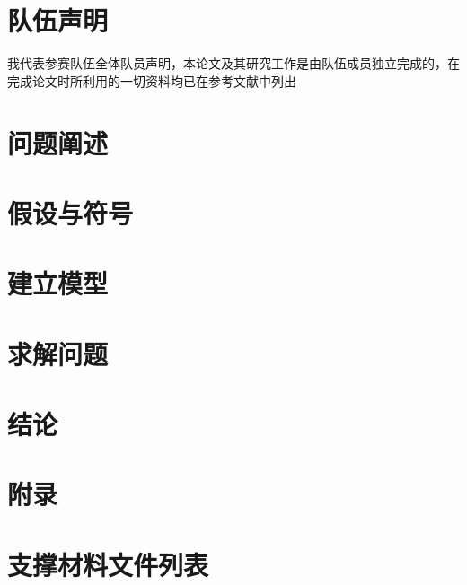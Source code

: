 \documentclass[zihao=-4,UTF8]{ctexart}
\begin{document}
\section*{队伍声明}

我代表参赛队伍全体队员声明，本论文及其研究工作是由队伍成员独立完成的，在完成论文时所利用的一切资料均已在参考文献中列出 
\newpage
\tableofcontents

\section{问题阐述}

\section{假设与符号}

\section{建立模型}

\section{求解问题}

\newpage
\section*{结论}


\newpage
\section*{附录}


\section*{支撑材料文件列表}
\end{document}
